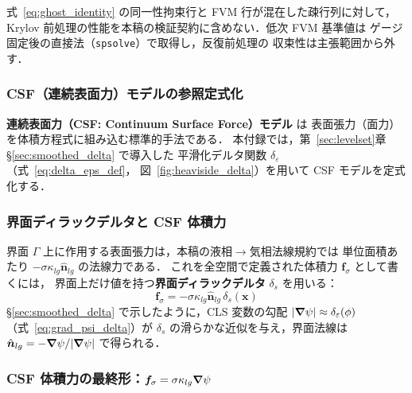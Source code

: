 \begin{tcolorbox}[warnbox, title={周期 FVM 行列のゲージと比較用途}]
  式~\eqref{eq:ghost_identity} の同一性拘束行と FVM 行が混在した疎行列に対して，
  Krylov 前処理の性能を本稿の検証契約に含めない．低次 FVM 基準値は
  ゲージ固定後の直接法（\texttt{spsolve}）で取得し，反復前処理の
  収束性は主張範囲から外す．
\end{tcolorbox}

\subsubsection{CSF（連続表面力）モデルの参照定式化}
\label{app:csf_full}

\textbf{連続表面力（CSF: Continuum Surface Force）モデル} \cite{Brackbill1992} は
表面張力（面力）を体積方程式に組み込む標準的手法である．
本付録では，第~\ref{sec:levelset}章§\ref{sec:smoothed_delta} で導入した
平滑化デルタ関数 $\delta_\varepsilon$（式~\eqref{eq:delta_eps_def}，
図~\ref{fig:heaviside_delta}）を用いて CSF モデルを定式化する．

\subsubsection{界面ディラックデルタと CSF 体積力}

界面 $\Gamma$ 上に作用する表面張力は，本稿の液相$\to$気相法線規約では
単位面積あたり $-\sigma\kappa_{lg}\hat{\bm{n}}_{lg}$ の法線力である．
これを全空間で定義された体積力 $\bm{f}_\sigma$ として書くには，
界面上だけ値を持つ\textbf{界面ディラックデルタ} $\delta_s$ を用いる：
\begin{equation}
  \bm{f}_\sigma = -\sigma\kappa_{lg}\hat{\bm{n}}_{lg}\,\delta_s(\bm{x})
  \label{eq:csf_dirac_app}
\end{equation}
§\ref{sec:smoothed_delta} で示したように，CLS 変数の勾配
$|\bm{\nabla}\psi| \approx \delta_\varepsilon(\phi)$（式~\eqref{eq:grad_psi_delta}）が
$\delta_s$ の滑らかな近似を与え，界面法線は
$\hat{\bm{n}}_{lg} = -\bm{\nabla}\psi/|\bm{\nabla}\psi|$ で得られる．

\subsubsection{CSF 体積力の最終形：\texorpdfstring{$\bm{f}_\sigma = \sigma\kappa_{lg}\bm{\nabla}\psi$}{f\_sigma = sigma*kappa_lg*grad(psi)}}

